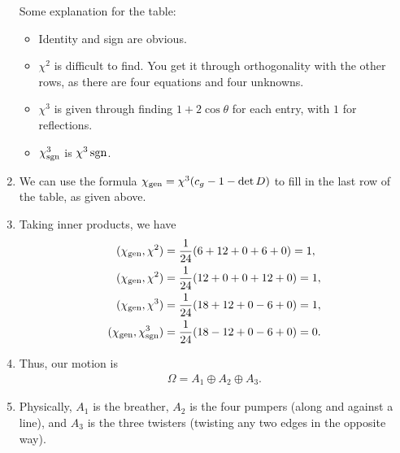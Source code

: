 \documentclass[11pt]{article}
\begin{document}
\begin{eexample}
\begin{enumerate}
\begin{table}[H]
\begin{tabular}{|c|c|c|c|c|c|}
            \end{tabular}
        \end{table}
        Some explanation for the table:
        \begin{itemize}
            \item Identity and sign are obvious.
            \item $\chi^2$ is difficult to find. You get it through orthogonality
            with the other rows, as there are four equations and four unknowns.
            \item $\chi^3$ is given through finding $1 + 2\cos{\theta}$ for each
            entry, with $1$ for reflections.
            \item $\chi^3_{\rm sgn}$ is $\chi^3 \, {\rm sgn}$.
        \end{itemize}
        \item We can use the formula $\chi_{\rm gen} = \chi^3 (c_g - 1 - \det{D})$
        to fill in the last row of the table, as given above.
        \item Taking inner products, we have
        \begin{align*}
            (\chi_{\rm gen}, \chi^2) & = \frac{1}{24} (6 + 12 + 0 + 6 + 0) = 1,\\
            (\chi_{\rm gen}, \chi^2) & = \frac{1}{24} (12 + 0 + 0 + 12 + 0) = 1,\\
            (\chi_{\rm gen}, \chi^3) & = \frac{1}{24} (18 + 12 + 0 - 6 + 0) = 1,\\
            (\chi_{\rm gen}, \chi^3_{\rm sgn}) & = \frac{1}{24} (18 - 12 + 0 - 6 + 0) = 0.
        \end{align*}
        \item Thus, our motion is
        \begin{align*}
            \boxed{\Omega = A_1 \oplus A_2 \oplus A_3.}
        \end{align*}
        \item Physically, $A_1$ is the breather, $A_2$ is the four
        pumpers (along and against a line), and $A_3$ is the three twisters (twisting any
        two edges in the opposite way).
    \end{enumerate}
\end{eexample}

\begin{eexample}
\end{eexample}

\begin{eexample}
\end{eexample}

\begin{eexample}
\end{eexample}


\end{document}
